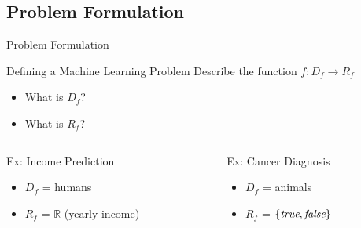 \documentclass[12pt]{beamer}
\newcommand{\EM}[1]{\mbox{\em#1}}
\begin{document}
\subsection{Problem Formulation}
\begin{frame}{Problem Formulation}
	\begin{block}{Defining a Machine Learning Problem}
		Describe the function $f\!: D_f \rightarrow R_f$
		\begin{itemize}
			\item What is $D_f$?
			\item What is $R_f$?
		\end{itemize}
	\end{block}
	\pause
	\begin{columns}
		\begin{column}{2in}
			\begin{block}{Ex: Income Prediction}
				\begin{itemize}
					\pause
					\item $D_f$ = \pause humans
					\pause
					\item $R_f$ = \pause $\mathbb{R}$ (yearly income)
				\end{itemize}
			\end{block}
		\end{column}
		\pause
		\begin{column}{2in}
			\begin{block}{Ex: Cancer Diagnosis}
				\begin{itemize}
					\pause
					\item $D_f$ = \pause animals
					\pause
					\item $R_f$ = \pause $\{\EM{true},\EM{false}\}$
				\end{itemize}
			\end{block}
		\end{column}
	\end{columns}
\end{frame}
\end{document}
